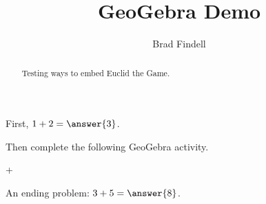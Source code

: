 \documentclass[nooutcomes]{ximera}
\title{GeoGebra Demo}
\author{Brad Findell}
\begin{document}
\begin{abstract}
Testing ways to embed Euclid the Game. 
\end{abstract}
\maketitle


\begin{problem}
First, $1+2=\answer{3}$.  

Then complete the following GeoGebra activity.  

\end{problem}

+\ifdefined\HCode
{}
\fi


\begin{problem}
An ending problem:  $3+5=\answer{8}$.  

\end{problem}

%
%
%
%
\end{document}
